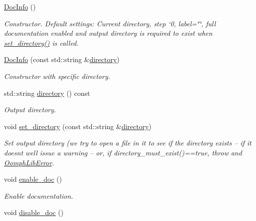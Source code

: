\begin{DoxyCompactItemize}
\item 
\hyperlink{classoomph_1_1DocInfo_ad6e3252144b9a6e1a1b93a6b8ea51111}{Doc\+Info} ()
\begin{DoxyCompactList}\small\item\em Constructor. Default settings\+: Current directory, step `0\textquotesingle{}, label=\char`\"{}\char`\"{}, full documentation enabled and output directory is required to exist when \hyperlink{classoomph_1_1DocInfo_a9800cf1d178162d521588e6e336a6e65}{set\+\_\+directory()} is called. \end{DoxyCompactList}\item 
\hyperlink{classoomph_1_1DocInfo_ac3cf3fea5013b3505b59b9f3e15872f1}{Doc\+Info} (const std\+::string \&\hyperlink{classoomph_1_1DocInfo_a85d58bcfce0a7b7cae461624e6fcd08a}{directory})
\begin{DoxyCompactList}\small\item\em Constructor with specific directory. \end{DoxyCompactList}\item 
std\+::string \hyperlink{classoomph_1_1DocInfo_a85d58bcfce0a7b7cae461624e6fcd08a}{directory} () const
\begin{DoxyCompactList}\small\item\em Output directory. \end{DoxyCompactList}\item 
void \hyperlink{classoomph_1_1DocInfo_a9800cf1d178162d521588e6e336a6e65}{set\+\_\+directory} (const std\+::string \&\hyperlink{classoomph_1_1DocInfo_a85d58bcfce0a7b7cae461624e6fcd08a}{directory})
\begin{DoxyCompactList}\small\item\em Set output directory (we try to open a file in it to see if the directory exists -- if it doesn\textquotesingle{}t we\textquotesingle{}ll issue a warning -- or, if directory\+\_\+must\+\_\+exist()==true, throw and \hyperlink{classoomph_1_1OomphLibError}{Oomph\+Lib\+Error}. \end{DoxyCompactList}\item 
void \hyperlink{classoomph_1_1DocInfo_a1a7842518e86de0f08d8dc130bee9376}{enable\+\_\+doc} ()
\begin{DoxyCompactList}\small\item\em Enable documentation. \end{DoxyCompactList}\item 
void \hyperlink{classoomph_1_1DocInfo_a666a20817ab9c396b225d8652bc0a338}{disable\+\_\+doc} ()

\end{DoxyCompactItemize}
